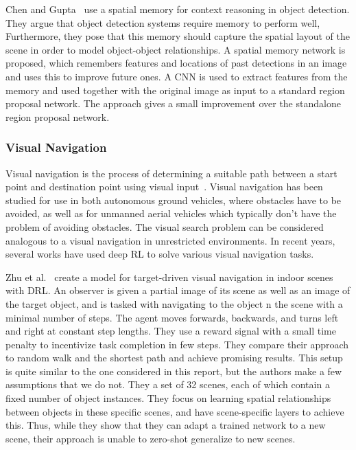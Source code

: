 Chen and Gupta~\cite{chen_memory_2017} use a spatial memory for context reasoning in object detection.
They argue that object detection systems require memory to perform well,
Furthermore, they pose that this memory should capture the spatial layout of the scene in order to model object-object relationships.
A spatial memory network is proposed, which remembers features and locations of past detections in an image and uses this to improve future ones.
A CNN is used to extract features from the memory and used together with the original image as input to a standard region proposal network.
The approach gives a small improvement over the standalone region proposal network.

\subsubsection{Visual Navigation}

Visual navigation is the process of determining a suitable path between a start point and destination point using visual input~\cite{bonin-font_visnav_2008}.
Visual navigation has been studied for use in both autonomous ground vehicles, where obstacles have to be avoided, as well as for unmanned aerial vehicles which typically don't have the problem of avoiding obstacles.
The visual search problem can be considered analogous to a visual navigation in unrestricted environments.
In recent years, several works have used deep RL to solve various visual navigation tasks.

Zhu et al.~\cite{zhu_target_2016} create a model for target-driven visual navigation in indoor scenes with DRL.
An observer is given a partial image of its scene as well as an image of the target object, and is tasked with navigating to the object n the scene with a minimal number of steps.
The agent moves forwards, backwards, and turns left and right at constant step lengths.
They use a reward signal with a small time penalty to incentivize task completion in few steps.
They compare their approach to random walk and the shortest path and achieve promising results.
This setup is quite similar to the one considered in this report, but the authors make a few assumptions that we do not.
They a set of 32 scenes, each of which contain a fixed number of object instances.
They focus on learning spatial relationships between objects in these specific scenes, and have scene-specific layers to achieve this.
Thus, while they show that they can adapt a trained network to a new scene, their approach is unable to zero-shot generalize to new scenes.

